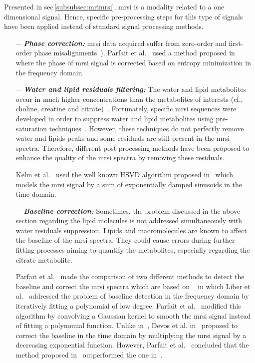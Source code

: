 Presented in \ac{sec}\,\ref{subsubsec:mrimrsi}, \ac{mrsi} is a modality related to a one dimensional signal. Hence, specific pre-processing steps for this type of signals have been applied instead of standard signal processing methods.

\begin{enumerate}[leftmargin=*]

\item[$-$] \textbf{\textit{Phase correction:}} \ac{mrsi} data acquired suffer from zero-order and first-order phase misalignments~\cite{Chen2002,Osorio-Garcia2012}). Parfait et al.~\cite{Parfait2012} used a method proposed in~\cite{Chen2002} where the phase of \ac{mrsi} signal is corrected based on entropy minimization in the frequency domain.

\item[$-$] \textbf{\textit{Water and lipid residuals filtering:}} The water and lipid metabolites occur in much higher concentrations than the metabolites of interests (cf., choline, creatine and citrate)~\cite{Zhu2010,Osorio-Garcia2012}. Fortunately, specific \ac{mrsi} sequences were developed in order to suppress water and lipid metabolites using pre-saturation techniques~\cite{Zhu2010}. However, these techniques do not perfectly remove water and lipids peaks and some residuals are still present in the \ac{mrsi} spectra. Therefore, different post-processing methods have been proposed to enhance the quality of the \ac{mrsi} spectra by removing these residuals.
  
  Kelm et al.~\cite{Kelm2007} used the well known HSVD algorithm proposed in~\cite{Pijnappel1992} which models the \ac{mrsi} signal by a sum of exponentially damped sinusoids in the time domain.

\item[$-$] \textbf{\textit{Baseline correction:}} Sometimes, the problem discussed in the above section regarding the lipid molecules is not addressed simultaneously with water residuals suppression. Lipids and macromolecules are known to affect the baseline of the \ac{mrsi} spectra. They could cause errors during further fitting processes aiming to quantify the metabolites, especially regarding the citrate metabolite.
  
  Parfait et al.~\cite{Parfait2012} made the comparison of two different methods to detect the baseline and correct the \ac{mrsi} spectra which are based on ~\cite{Lieber2003,Devos2004} in which Liber et al.~\cite{Lieber2003} addressed the problem of baseline detection in the frequency domain by iteratively fitting a polynomial of low degree. Parfait et al.~\cite{Parfait2012} modified this algorithm by convolving a Gaussian kernel to smooth the \ac{mrsi} signal instead of fitting a polynomial function. Unlike in~\cite{Lieber2003}, Devos et al. in~\cite{Devos2004} proposed to correct the baseline in the time domain by multiplying the \ac{mrsi} signal by a decreasing exponential function. However, Parfait et al.~\cite{Parfait2012} concluded that the method proposed in~\cite{Lieber2003} outperformed the one in~\cite{Devos2004}. 


\end{enumerate}
